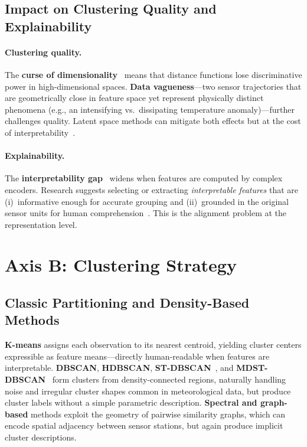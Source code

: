 \documentclass{article}
\theoremstyle{plain}
\theoremstyle{definition}
\theoremstyle{remark}
\begin{document}
\subsection{Impact on Clustering Quality and Explainability}

\paragraph{Clustering quality.}
The \textbf{curse of dimensionality}~\cite{goos_surprising_2001} means that
distance functions lose discriminative power in high-dimensional spaces.
\textbf{Data vagueness}---two sensor trajectories that are geometrically
close in feature space yet represent physically distinct phenomena (e.g.,
an intensifying vs.\ dissipating temperature anomaly)---further
challenges quality. Latent space methods can mitigate both effects but
at the cost of interpretability~\cite{oord_neural_2018}.

\paragraph{Explainability.}
The \textbf{interpretability gap}~\cite{schlegel_towards_2025} widens when
features are computed by complex encoders. Research suggests selecting
or extracting \emph{interpretable features} that are (i)~informative
enough for accurate grouping and (ii)~grounded in the original sensor
units for human comprehension~\cite{hu_interpretable_2025}. This is the
alignment problem at the representation level.

\section{Axis B: Clustering Strategy}
\label{sec:clustering}

\subsection{Classic Partitioning and Density-Based Methods}

\textbf{K-means} assigns each observation to its nearest centroid,
yielding cluster centers expressible as feature means---directly
human-readable when features are interpretable. \textbf{DBSCAN},
\textbf{HDBSCAN}, \textbf{ST-DBSCAN}~\cite{birant_st-dbscan_2007}, and \textbf{MDST-DBSCAN}~\cite{choi_mdst-dbscan_2021} form clusters from density-connected regions, naturally
handling noise and irregular cluster shapes common in meteorological data, but produce cluster labels without a simple parametric description.
\textbf{Spectral and graph-based} methods exploit the geometry of
pairwise similarity graphs, which can encode spatial adjacency between
sensor stations, but again produce implicit cluster descriptions.
\end{document}
